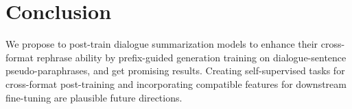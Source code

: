 \section{Conclusion}

We propose to post-train dialogue summarization models to enhance their 
cross-format rephrase ability by prefix-guided generation training on 
dialogue-sentence pseudo-paraphrases, and get promising results. 
Creating self-supervised tasks for cross-format post-training and 
incorporating compatible features for downstream fine-tuning are 
plausible future directions. 
